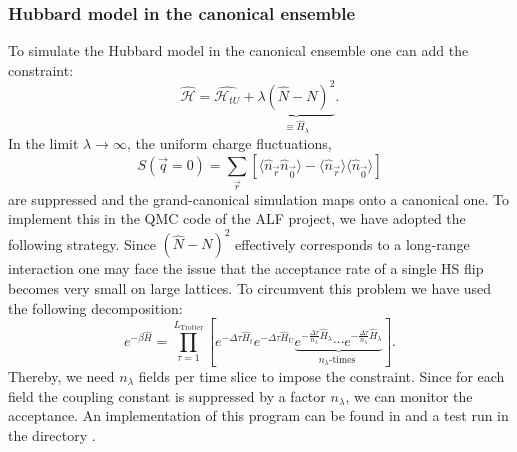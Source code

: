 \subsubsection{Hubbard  model in the canonical ensemble}

To simulate the Hubbard model in the canonical ensemble  one can add the constraint: 
\begin{equation}
	\hat{\mathcal{H}}   = \hat{\mathcal{H}_{tU}}     + \underbrace{\lambda \left( \hat{N} -  N \right)^{2}}_{\equiv \hat{H}_\lambda }.
\end{equation}
In the limit $\lambda \rightarrow \infty $, the uniform charge fluctuations,
\begin{equation} 
      S ( \vec{q} = 0)   =  \sum_{\vec{r}}   \left[ \langle \hat{n}_{\vec{r}}  \hat{n}_{\vec{0}} \rangle  - \langle \hat{n}_{\vec{r}}\rangle \langle  \hat{n}_{\vec{0}} \rangle  \right]
\end{equation} 
are suppressed and the grand-canonical simulation maps onto a canonical one.  
To implement this in the QMC code of the ALF project,  we have adopted the following strategy.   Since  $ \left( \hat{N} -  N \right)^{2}  $ effectively corresponds to a long-range interaction one may   face the issue that the acceptance rate of a single  HS flip becomes very small on large lattices. To circumvent this problem we have  used the following decomposition: 
\begin{equation}
	e^{-\beta \hat{H}}  =   \prod_{\tau = 1}^{L_{\text{Trotter}}} \left[  e^{-\Delta \tau \hat{H}_t} e^{-\Delta \tau \hat{H}_U}  
	\underbrace{e^{-\frac{\Delta \tau}{n_{\lambda}} \hat{H}_{\lambda} } \cdots e^{-\frac{\Delta \tau}{n_{\lambda}} \hat{H}_{\lambda} } }_{n_\lambda \text{-times } }\right].
\end{equation}
Thereby, we need $n_\lambda $ fields per time slice  to impose the constraint.  Since for each field the coupling  constant is suppressed by a factor $n_{\lambda}$, we can monitor the acceptance. 
An implementation of this program can be found in    and a test run in the directory .
